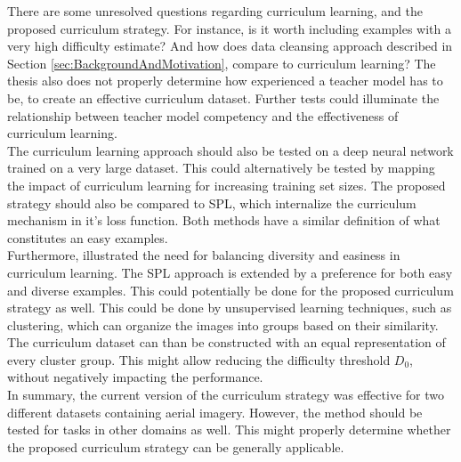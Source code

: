 There are some unresolved questions regarding curriculum learning, and the proposed curriculum strategy. For instance, is it worth including examples with a very high difficulty estimate? And how does data cleansing approach described in Section \ref{sec:BackgroundAndMotivation}, compare to curriculum learning? The thesis also does not properly determine how experienced a teacher model has to be, to create an effective curriculum dataset. Further tests could illuminate the relationship between teacher model competency and the effectiveness of curriculum learning.  \\

The curriculum learning approach should also be tested on a deep neural network trained on a very large dataset. This could alternatively be tested by mapping the impact of curriculum learning for increasing training set sizes. The proposed strategy should also be compared to \ac{SPL}\citep{Kumar_self_paced_learning}, which internalize the curriculum mechanism in it's loss function. Both methods have a similar definition of what constitutes an easy examples.\\

Furthermore, \cite{Lu_self-paced_learning_diversity} illustrated the need for balancing diversity and easiness in curriculum learning. The \ac{SPL} approach is extended by a preference for both easy and diverse examples. This could potentially be done for the proposed curriculum strategy as well. This could be done by unsupervised learning techniques, such as clustering, which can organize the images into groups based on their similarity. The curriculum dataset can than be constructed with an equal representation of every cluster group. This might allow reducing the difficulty threshold $D_0$, without negatively impacting the performance.\\

In summary, the current version of the curriculum strategy was effective for two different datasets containing aerial imagery. However, the method should be tested for tasks in other domains as well. This might properly determine whether the proposed curriculum strategy can be generally applicable.\\
 

